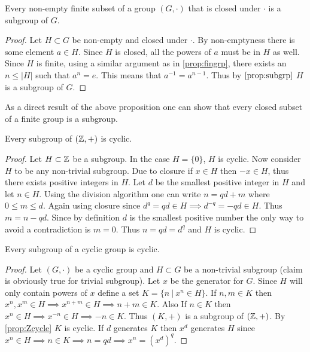 \begin{proposition}
  Every non-empty finite subset of a group $(G,\cdot)$ that is closed under $\cdot$ is a subgroup of $G$. 
\end{proposition}
\begin{proof}
  Let $H\subset G$ be non-empty and closed under $\cdot$. By non-emptyness there is some element $a\in H$. Since $H$ is closed, all the powers of $a$ must be in $H$ as well. Since $H$ is finite, using a similar argument as in \cref{prop:fingrp}, there exists an $n\leq |H|$ such that $a^n =e$. This means that $a^{-1} = a^{n-1}$. Thus by $\cref{prop:subgrp}$ $H$ is a subgroup of $G$.
\end{proof}
\begin{remark}
  As a direct result of the above proposition one can show that every closed subset of a finite group is a subgroup.
\end{remark}
\begin{proposition}\label{prop:Zcycle}
  Every subgroup of $(\mathbb{Z},+)$ is cyclic.
\end{proposition}
\begin{proof}
  Let $H\subset \mathbb{Z}$ be a subgroup. In the case $H=\{0\}$, $H$ is cyclic. Now consider $H$ to be any non-trivial subgroup. Due to closure if $x\in H$ then $-x\in H$, thus there exists positive integers in $H$. Let $d$ be the smallest positive integer in $H$ and let $n\in H$. Using the division algorithm one can write $n = qd + m$ where $0\leq m\leq d$. Again using closure since $d^q = qd \in H \implies d^{-q} = -qd \in H$. Thus $m = n - qd$. Since by definition $d$ is the smallest positive number the only way to avoid a contradiction is $m=0$. Thus $n=qd = d^q$ and $H$ is cyclic.
\end{proof}
\begin{proposition}\label{prop:Gcycle}
  Every subgroup of a cyclic group is cyclic.
\end{proposition}
\begin{proof}
  Let $(G,\cdot)$ be a cyclic group and $H\subset G$ be a non-trivial subgroup (claim is obviously true for trivial subgroup). Let $x$ be the generator for $G$. Since $H$ will only contain powers of $x$ define a set $K = \{n\ |\ x^n \in H\}$. If $n,m\in K$ then $x^n,x^m \in H\implies x^{n+m}\in H \implies n+m \in K$. Also If $n\in K$ then $x^n\in H\implies x^{-n} \in H\implies -n\in K$. Thus $(K,+)$ is a subgroup of $(\mathbb{Z},+)$. By \cref{prop:Zcycle} $K$ is cyclic. If $d$ generates $K$ then $x^d$ generates $H$ since $x^n \in H\implies n\in K \implies n=qd \implies x^n = (x^d)^q$. 
\end{proof}
